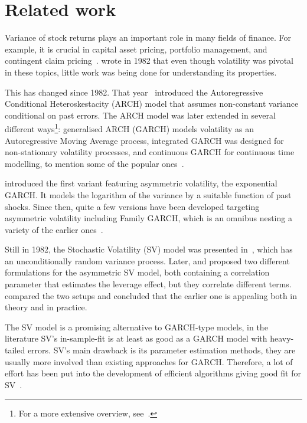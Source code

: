 \section{Related work}

Variance of stock returns plays an important role in many fields of finance.
For example, it is crucial in capital asset pricing, portfolio management, and contingent claim pricing~\citep{hull1987pricing,skiadas2009asset,chow2014study}.
\citeauthor{Christie1982} wrote in 1982 that even though volatility was pivotal in these topics, little work was being done for understanding its properties.

This has changed since 1982.
That year~\citet{Engle1982} introduced the Autoregressive Conditional Heteroskestacity (ARCH) model that assumes non-constant variance conditional on past errors.
The ARCH model was later extended in several different ways\footnote{For a more extensive overview, see~\citet{bollerslev1994arch}.}: generalised ARCH (GARCH) models volatility as an Autoregressive Moving Average process, integrated GARCH was designed for non-stationary volatility processes, and continuous GARCH for continuous time modelling, to mention some of the popular ones~\citep{Bollerslev1986,engle1986modelling,box1994time,kluppelberg2004continuous}.

\citet{Nelson1991} introduced the first variant featuring asymmetric volatility, the exponential GARCH.
It models the logarithm of the variance by a suitable function of past shocks.
Since then, quite a few versions have been developed targeting asymmetric volatility including Family GARCH, which is an omnibus nesting a variety of the earlier ones~\citep{engle1993measuring,glosten1993relation,zakoian1994threshold,sentana1995quadratic,hentschel1995all}.

Still in 1982, the Stochastic Volatility (SV) model was presented in~\citet{Taylor1982}, which has an unconditionally random variance process.
Later, \citet{Harvey1996} and \citet{Jacquier2004} proposed two different formulations for the asymmetric SV model, both containing a correlation parameter that estimates the leverage effect, but they correlate different terms.
~\citet{yu2005leverage} compared the two setups and concluded that the earlier one is appealing both in theory and in practice.

The SV model is a promising alternative to GARCH-type models, in the literature SV's in-sample-fit is at least as good as a GARCH model with heavy-tailed errors.
SV's main drawback is its parameter estimation methods, they are usually more involved than existing approaches for GARCH.
Therefore, a lot of effort has been put into the development of efficient algorithms giving good fit for SV~\citep{Kim1998,jacquier2002bayesian,Omori2007,Kastner2014,Chan2016}.

